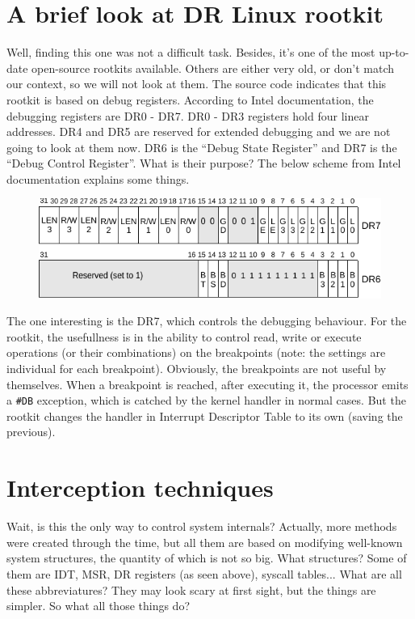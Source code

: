 \documentclass[12pt]{article}
\begin{document}
  \section{A brief look at DR Linux rootkit}
  
  Well, finding this one was not a difficult task. Besides, it's one of the
  most up-to-date open-source rootkits available. Others are either very old,
  or don't match our context, so we will not look at them. The source code
  indicates that this rootkit is based on debug registers. According to Intel
  documentation, the debugging registers are DR0 - DR7. DR0 - DR3 registers
  hold four linear addresses. DR4 and DR5 are reserved for extended debugging
  and we are not going to look at them now. DR6 is the ``Debug State
  Register'' and DR7 is the ``Debug Control Register''. What is their purpose?
  The below scheme from Intel documentation explains some things.
  \begin{figure}[h]
    \includegraphics[width=\linewidth, keepaspectratio]{dregs}
  \end{figure}
  The one interesting is the DR7, which controls the debugging behaviour. For
  the rootkit, the usefullness is in the ability to control read, write or
  execute operations (or their combinations) on the breakpoints (note: the
  settings are individual for each breakpoint). Obviously, the breakpoints are
  not useful by themselves. When a breakpoint is reached, after executing it,
  the processor emits a \verb!#DB! exception, which is catched by the kernel
  handler in normal cases. But the rootkit changes the handler in Interrupt
  Descriptor Table to its own (saving the previous).

  \section{Interception techniques}

  Wait, is this the only way to control system internals? Actually, more
  methods were created through the time, but all them are based on modifying
  well-known system structures, the quantity of which is not so big. What
  structures? Some of them are IDT, MSR, DR registers (as seen
  above), syscall tables... What are all these abbreviatures? They may look
  scary at first sight, but the things are simpler. So what all those things do?
\end{document}
